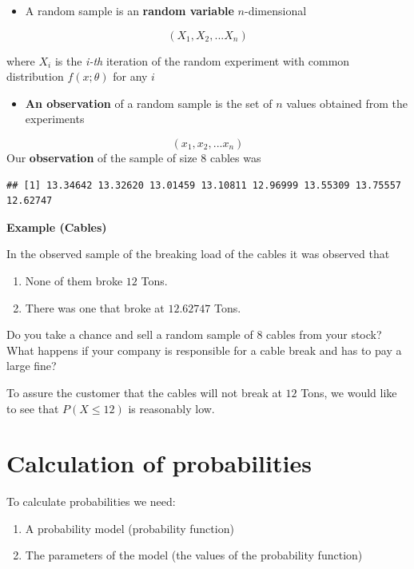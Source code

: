 \documentclass[
]{book}
\providecommand{\tightlist}{%
  \setlength{\itemsep}{0pt}\setlength{\parskip}{0pt}}
\begin{document}
\begin{itemize}
\tightlist
\item
  A random sample is an \textbf{random variable} \(n\)-dimensional
\end{itemize}

\[(X_1, X_2, ... X_n)\]

where \(X_i\) is the \emph{i-th} iteration of the random experiment with common distribution \(f(x; \theta)\) for any \(i\)

\begin{itemize}
\tightlist
\item
  \textbf{An observation} of a random sample is the set of \(n\) values obtained from the experiments
\end{itemize}

\[(x_1, x_2, ... x_n)\]
Our \textbf{observation} of the sample of size \(8\) cables was

\begin{verbatim}
## [1] 13.34642 13.32620 13.01459 13.10811 12.96999 13.55309 13.75557 12.62747
\end{verbatim}

\textbf{Example (Cables)}

In the observed sample of the breaking load of the cables it was observed that

\begin{enumerate}
\def\labelenumi{\arabic{enumi})}
\item
  None of them broke \(12\) Tons.
\item
  There was one that broke at \(12.62747\) Tons.
\end{enumerate}

Do you take a chance and sell a random sample of \(8\) cables from your stock? What happens if your company is responsible for a cable break and has to pay a large fine?

To assure the customer that the cables will not break at \(12\) Tons, we would like to see that \(P(X \leq 12)\) is reasonably low.

\hypertarget{calculation-of-probabilities}{%
\section{Calculation of probabilities}\label{calculation-of-probabilities}}

To calculate probabilities we need:

\begin{enumerate}
\def\labelenumi{\arabic{enumi}.}
\item
  A probability model (probability function)
\item
  The parameters of the model (the values of the probability function)
\end{enumerate}
\end{document}
